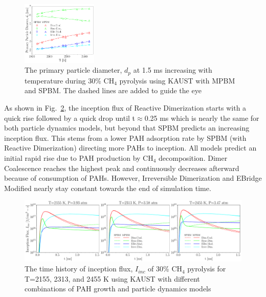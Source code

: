 \begin{figure}[H]
	\centering
	\includegraphics[width=0.32\textwidth]{Figures/Results/Shocktube/Stanford/june/30CH4_sootdp_kaust_1.5ms.pdf}
	\caption{The primary particle diameter, $d_p$ at 1.5 ms increasing with temperature during 30\% $\mathrm{CH_4}$ pyrolysis using KAUST with MPBM and SPBM. The dashed lines are added to guide the eye}
	\label{fig:shocktubest_30ch4_dp_kaust_last} 
\end{figure}

As shown in Fig.~\ref{fig:shocktubest_30ch4_Iinc_kaust_subset}, the inception flux of Reactive Dimerization starts with a quick rise followed by a quick drop until t$\approx$0.25 ms which is nearly the same for both particle dynamics models, but beyond that SPBM predicts an increasing inception flux. This stems from a lower PAH adsorption rate by SPBM (with Reactive Dimerization) directing more PAHs to inception. All models predict an initial rapid rise due to PAH production by $\mathrm{CH_4}$ decomposition. Dimer Coalescence reaches the highest peak and continuously decreases afterward because of consumption of PAHs. However, Irreversible Dimerization and EBridge Modified nearly stay constant towards the end of simulation time. 

\begin{figure}[H]
	\centering
	\includegraphics[width=1\textwidth]{Figures/Results/Shocktube/Stanford/june/30CH4_sootIinc_kaust_subset.pdf}
	\caption{The time history of inception flux, $I_{inc}$ of 30\% $\mathrm{CH_4}$ pyrolysis for T=2155, 2313, and 2455 K using KAUST with different combinations of PAH growth and particle dynamics models}
	\label{fig:shocktubest_30ch4_Iinc_kaust_subset} 
\end{figure}

